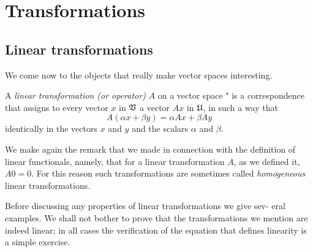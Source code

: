 \chapter{Transformations}

\section{Linear transformations}

We come now to the objects that really make vector spaces interesting.

\begin{definition}
    A \emph{linear transformation (or operator)} \(A\) on a vector space " is a correspondence that assigns to every vector \(x\) in \(\frak{V}\) a vector \(Ax\) in \(\frak{U}\), in such a way that
    \begin{equation*}
        A(\alpha x + \beta y) = \alpha Ax + \beta Ay
    \end{equation*}
identically in the vectors \(x\) and \(y\) and the scalars \(\alpha\) and \(\beta\).
\end{definition}

We make again the remark that we made in connection with the definition of
linear functionals, namely, that for a linear transformation \(A\), as we
defined it, \(A0 = 0\). For this reason such transformations are sometimes
called \emph{homogeneous} linear transformations.

Before discussing any properties of linear transformations we give sev- eral
examples. We shall not bother to prove that the transformations we mention are
indeed linear; in all cases the verification of the equation that defines
linearity is a simple exercise.

